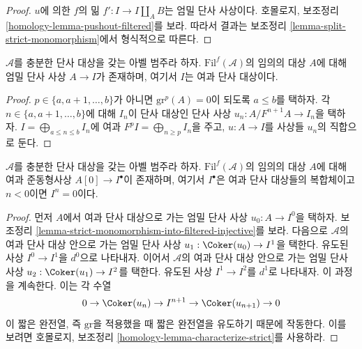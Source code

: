 \begin{proof}
$u$에 의한 $f$의 밂 $f' : I \to I \amalg_A B$는 엄밀 단사 사상이다.
호몰로지, 보조정리 \ref{homology-lemma-pushout-filtered}를 보라.
따라서 결과는 보조정리 \ref{lemma-split-strict-monomorphism}에서
형식적으로 따른다.
\end{proof}

\begin{lemma}
\label{lemma-strict-monomorphism-into-filtered-injective}
$\mathcal{A}$를 충분한 단사 대상을 갖는 아벨 범주라 하자.
$\text{Fil}^f(\mathcal{A})$의 임의의 대상 $A$에 대해 엄밀 단사 사상
$A \to I$가 존재하며, 여기서 $I$는 여과 단사 대상이다.
\end{lemma}

\begin{proof}
$p \in \{a, a + 1, \ldots, b\}$가 아니면
$\text{gr}^p(A) = 0$이 되도록 $a \leq b$를 택하자.
각 $n \in \{a, a + 1, \ldots, b\}$에 대해 $I_n$이 단사 대상인
단사 사상 $u_n : A/F^{n + 1}A \to I_n$을 택하자.
$I = \bigoplus_{a \leq n \leq b} I_n$에 여과
$F^pI = \bigoplus_{n \geq p} I_n$을 주고, $u : A \to I$를 사상들
$u_n$의 직합으로 둔다.
\end{proof}

\begin{lemma}
\label{lemma-filtered-injective-right-resolution-single-object}
$\mathcal{A}$를 충분한 단사 대상을 갖는 아벨 범주라 하자.
$\text{Fil}^f(\mathcal{A})$의 임의의 대상 $A$에 대해 여과
준동형사상 $A[0] \to I^\bullet$이 존재하며, 여기서 $I^\bullet$은
여과 단사 대상들의 복합체이고 $n < 0$이면 $I^n = 0$이다.
\end{lemma}

\begin{proof}
먼저 $A$에서 여과 단사 대상으로 가는 엄밀 단사 사상
$u_0 : A \to I^0$을 택하자. 보조정리
\ref{lemma-strict-monomorphism-into-filtered-injective}를 보라.
다음으로 $\mathcal{A}$의 여과 단사 대상 안으로 가는 엄밀 단사 사상
$u_1 : \Coker(u_0) \to I^1$을 택한다.
유도된 사상 $I^0 \to I^1$을 $d^0$으로 나타내자. 이어서
$\mathcal{A}$의 여과 단사 대상 안으로 가는 엄밀 단사 사상
$u_2 : \Coker(u_1) \to I^2$를 택한다. 유도된 사상 $I^1 \to I^2$를
$d^1$로 나타내자. 이 과정을 계속한다. 이는 각 수열
$$
0 \to \Coker(u_n) \to I^{n + 1} \to \Coker(u_{n + 1}) \to 0
$$
이 짧은 완전열, 즉 $\text{gr}$을 적용했을 때 짧은 완전열을
유도하기 때문에 작동한다. 이를 보려면 호몰로지, 보조정리
\ref{homology-lemma-characterize-strict}를 사용하라.
\end{proof}

